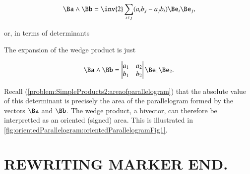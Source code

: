 \begin{dmath}\label{eqn:SimpleProducts2:1300}
\Ba \wedge \Bb
=
\inv{2} \sum_{i \ne j} (a_i b_j - a_j b_i) \Be_i \Be_j,
\end{dmath}

or, in terms of determinants


The  expansion of the wedge product is just

\begin{dmath}\label{eqn:SimpleProducts2:1340}
\Ba \wedge \Bb
=
\begin{vmatrix}
a_1 & a_2 \\
b_1 & b_2
\end{vmatrix}
\Be_1 \Be_2.
\end{dmath}

Recall (\cref{problem:SimpleProducts2:areaofparallelogram}) that the absolute value of this determinant is precisely the area of the parallelogram formed by the vectors \( \Ba \) and \( \Bb \).  The wedge product, a bivector, can therefore be interpretted as an oriented (signed) area.  This is illustrated in \cref{fig:orientedParallelogram:orientedParallelogramFig1}.




\section{REWRITING MARKER END.}

